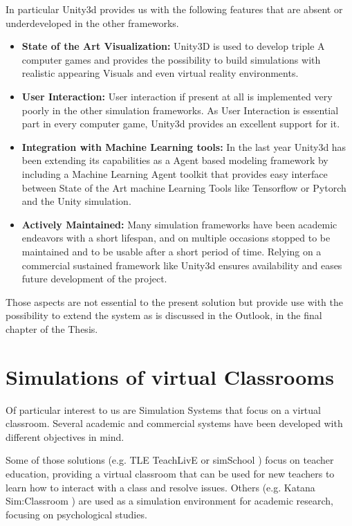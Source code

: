 In particular Unity3d provides us with the following features that are absent
or underdeveloped in the other frameworks.

\begin{itemize}
    \item \textbf{State of the Art Visualization:} Unity3D is used to develop triple
    A computer games and provides the possibility to build simulations with realistic
    appearing Visuals and even virtual reality environments.
    \item \textbf{User Interaction:} User interaction if present at all is implemented
    very poorly in the other simulation frameworks. As User Interaction is essential
    part in every computer game, Unity3d provides an excellent support for it.
    \item \textbf{Integration with Machine Learning tools:} In the last year
    Unity3d has been extending its capabilities as a Agent based modeling framework
    by including a Machine Learning Agent toolkit that provides easy
    interface between State of the Art machine Learning Tools like Tensorflow or Pytorch
    and the Unity simulation.
    \item \textbf{Actively Maintained:} Many simulation frameworks have been academic endeavors
    with a short lifespan, and on multiple occasions stopped to be maintained and
    to be usable after a short period of time. Relying on a commercial sustained
    framework like Unity3d ensures availability and eases future development of
    the project.
\end{itemize}

Those aspects are not essential to the present solution but provide use with
the possibility to extend the system as is discussed in the Outlook, in the final
chapter of the Thesis.

\section{Simulations of virtual Classrooms}
Of particular interest to us are Simulation Systems that focus on a virtual classroom. 
Several academic and commercial systems have been developed with different objectives in mind.

\bb

Some of those solutions (e.g. TLE TeachLivE\cite{Dieker2014}\cite{Dieker2017} or
simSchool \cite{Badiee2015}) focus on teacher education, providing a virtual classroom
that can be used for new teachers to learn how to interact with a class and resolve issues.
Others (e.g. Katana Sim:Classroom \cite{Blume2019}) are used as a simulation
environment for academic research, focusing on psychological studies.

